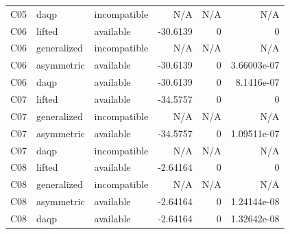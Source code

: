 \begin{table}[htbp]
\begin{tabularx}{\textwidth}{@{}ll>{\raggedright\arraybackslash}Xrrr@{}}
C05 & daqp & incompatible & N/\allowbreak{}A & N/\allowbreak{}A & N/\allowbreak{}A\\
C06 & lifted & available & -30.\allowbreak{}6139 & 0 & 0\\
C06 & generalized & incompatible & N/\allowbreak{}A & N/\allowbreak{}A & N/\allowbreak{}A\\
C06 & asymmetric & available & -30.\allowbreak{}6139 & 0 & 3.\allowbreak{}66003e-07\\
C06 & daqp & available & -30.\allowbreak{}6139 & 0 & 8.\allowbreak{}1416e-07\\
C07 & lifted & available & -34.\allowbreak{}5757 & 0 & 0\\
C07 & generalized & incompatible & N/\allowbreak{}A & N/\allowbreak{}A & N/\allowbreak{}A\\
C07 & asymmetric & available & -34.\allowbreak{}5757 & 0 & 1.\allowbreak{}09511e-07\\
C07 & daqp & incompatible & N/\allowbreak{}A & N/\allowbreak{}A & N/\allowbreak{}A\\
C08 & lifted & available & -2.\allowbreak{}64164 & 0 & 0\\
C08 & generalized & incompatible & N/\allowbreak{}A & N/\allowbreak{}A & N/\allowbreak{}A\\
C08 & asymmetric & available & -2.\allowbreak{}64164 & 0 & 1.\allowbreak{}24144e-08\\
C08 & daqp & available & -2.\allowbreak{}64164 & 0 & 1.\allowbreak{}32642e-08\\
\bottomrule\end{tabularx}
\end{table}
